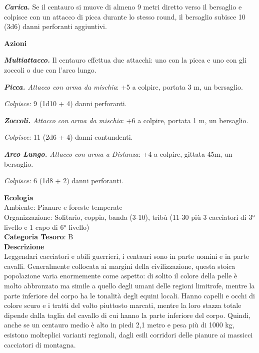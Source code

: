 \begin{multicols}{2}
{\emph{\textbf{Carica.}} Se il centauro si muove di almeno 9 metri diretto verso il bersaglio e colpisce con un attacco di picca durante lo stesso round, il bersaglio subisce 10 (3d6) danni perforanti aggiuntivi.

\textbf{Azioni}

\emph{\textbf{Multiattacco.}} Il centauro effettua due attacchi: uno con la picca e uno con gli zoccoli o due con l'arco lungo.

\emph{\textbf{Picca.} Attacco con arma da mischia}: +5 a colpire, portata 3 m, un bersaglio.

\emph{Colpisce:} 9 (1d10 + 4) danni perforanti.

\emph{\textbf{Zoccoli.} Attacco con arma da mischia}: +6 a colpire, portata 1 m, un bersaglio.

\emph{Colpisce:} 11 (2d6 + 4) danni contundenti.

\emph{\textbf{Arco Lungo.} Attacco con arma a Distanza}: +4 a colpire, gittata 45m, un bersaglio.

\emph{Colpisce:} 6 (1d8 + 2) danni perforanti.

\textbf{Ecologia}\\
Ambiente: Pianure e foreste temperate\\
Organizzazione: Solitario, coppia, banda (3-10), tribù (11-30 più 3 cacciatori di 3° livello e 1 capo di 6° livello)\\
\textbf{Categoria Tesoro}: B\\
\textbf{Descrizione}\\
Leggendari cacciatori e abili guerrieri, i centauri sono in parte uomini e in parte cavalli. Generalmente collocata ai margini della civilizzazione, questa stoica popolazione varia enormemente come aspetto: di solito il colore della pelle è molto abbronzato ma simile a quello degli umani delle regioni limitrofe, mentre la parte inferiore del corpo ha le tonalità degli equini locali. Hanno capelli e occhi di colore scuro e i tratti del volto piuttosto marcati, mentre la loro stazza totale dipende dalla taglia del cavallo di cui hanno la parte inferiore del corpo. Quindi, anche se un centauro medio è alto in piedi 2,1 metro e pesa più di 1000 kg, esistono molteplici varianti regionali, dagli esili corridori delle pianure ai massicci cacciatori di montagna.

}
\end{multicols}
